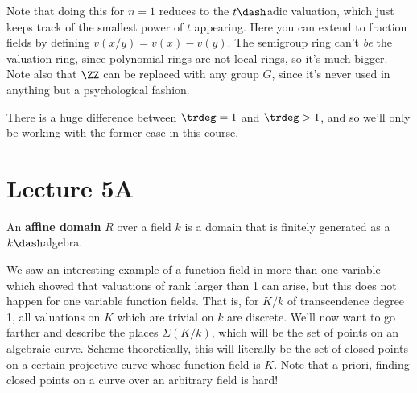 Note that doing this for \(n=1\) reduces to the \(t\dash\)adic
valuation, which just keeps track of the smallest power of \(t\)
appearing. Here you can extend to fraction fields by defining
\(v(x/y) = v(x) - v(y)\). The semigroup ring can't \emph{be} the
valuation ring, since polynomial rings are not local rings, so it's much
bigger. Note also that \(\ZZ\) can be replaced with any group \(G\),
since it's never used in anything but a psychological fashion.

\begin{slogan}

There is a huge difference between \(\trdeg = 1\) and \(\trdeg > 1\),
and so we'll only be working with the former case in this course.

\end{slogan}

\hypertarget{lecture-5a}{%
\section{Lecture 5A}\label{lecture-5a}}

\begin{definition}

An \textbf{affine domain} \(R\) over a field \(k\) is a domain that is
finitely generated as a \(k\dash\)algebra.

\end{definition}

We saw an interesting example of a function field in more than one
variable which showed that valuations of rank larger than 1 can arise,
but this does not happen for one variable function fields. That is, for
\(K/k\) of transcendence degree 1, all valuations on \(K\) which are
trivial on \(k\) are discrete. We'll now want to go farther and describe
the places \(\Sigma(K/k)\), which will be the set of points on an
algebraic curve. Scheme-theoretically, this will literally be the set of
closed points on a certain projective curve whose function field is
\(K\). Note that a priori, finding closed points on a curve over an
arbitrary field is hard!

